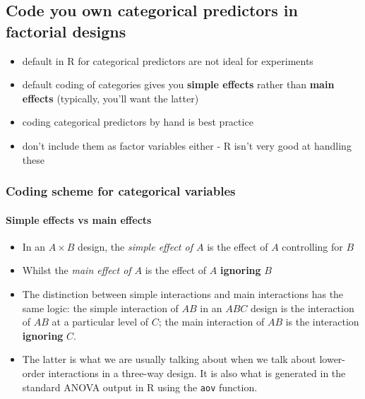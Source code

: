\documentclass[
]{article}
\providecommand{\tightlist}{%
  \setlength{\itemsep}{0pt}\setlength{\parskip}{0pt}}
\begin{document}
\hypertarget{code-you-own-categorical-predictors-in-factorial-designs}{%
\subsection{Code you own categorical predictors in factorial
designs}\label{code-you-own-categorical-predictors-in-factorial-designs}}

\begin{itemize}
\tightlist
\item
  default in R for categorical predictors are not ideal for experiments
\item
  default coding of categories gives you \textbf{simple effects} rather
  than \textbf{main effects} (typically, you'll want the latter)
\item
  coding categorical predictors by hand is best practice
\item
  don't include them as factor variables either - R isn't very good at
  handling these
\end{itemize}

\hypertarget{coding-scheme-for-categorical-variables}{%
\subsubsection{Coding scheme for categorical
variables}\label{coding-scheme-for-categorical-variables}}

\hypertarget{simple-effects-vs-main-effects}{%
\paragraph{Simple effects vs main
effects}\label{simple-effects-vs-main-effects}}

\begin{itemize}
\tightlist
\item
  In an \(A \times B\) design, the \emph{simple effect of \(A\)} is the
  effect of \(A\) controlling for \(B\)
\item
  Whilst the \emph{main effect of \(A\)} is the effect of \(A\)
  \textbf{ignoring} \(B\)
\item
  The distinction between simple interactions and main interactions has
  the same logic: the simple interaction of \(AB\) in an \(ABC\) design
  is the interaction of \(AB\) at a particular level of \(C\); the main
  interaction of \(AB\) is the interaction \textbf{ignoring} \(C\).
\item
  The latter is what we are usually talking about when we talk about
  lower-order interactions in a three-way design. It is also what is
  generated in the standard ANOVA output in R using the \texttt{aov}
  function.
\end{itemize}
\end{document}

